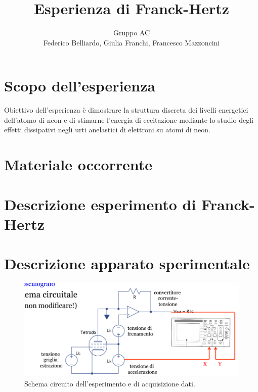 \documentclass[10pt,a4paper]{article}
\author{Gruppo AC \\ Federico Belliardo, Giulia Franchi, Francesco Mazzoncini}
\title{Esperienza di Franck-Hertz}
\begin{document}
\maketitle



\section{Scopo dell'esperienza}
Obiettivo dell'esperienza è dimostrare la struttura discreta dei livelli energetici dell'atomo di neon e di stimarne l'energia di eccitazione mediante lo studio degli effetti dissipativi negli urti anelastici di elettroni su atomi di neon.

\section{Materiale occorrente}

\section{Descrizione esperimento di Franck-Hertz}

\section{Descrizione apparato sperimentale}


\begin{figure}[!htb]
  \centering
  \includegraphics[scale=.5]{circuito.png}
\caption{Schema circuito dell'esperimento e di acquisizione dati.}
\label{circuito}
\end{figure}
\end{document}
